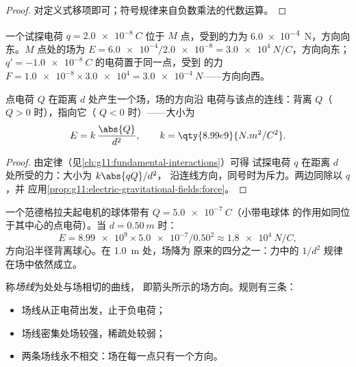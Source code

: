 \begin{proof}
对定义式移项即可；符号规律来自负数乘法的代数运算。
\end{proof}

\begin{example}[读取场]\label{ex:g11:electric-gravitational-fields:reading}
一个试探电荷 $q = \qty{+2.0e-8}{C}$ 位于 $M$ 点，受到的力为
\qty{6.0e-4}{N}，方向向东。$M$ 点处的场为
$E = \num{6.0e-4} / \num{2.0e-8} = \qty{3.0e4}{N/C}$，方向向东；
$q' = \qty{-1.0e-8}{C}$ 的电荷置于同一点，受到
的力 $F = \num{1.0e-8} \times \num{3.0e4} = \qty{3.0e-4}{N}$——方向向西。
\end{example}

\begin{proposition}[点电荷的场]\label{prop:g11:electric-gravitational-fields:point}
点电荷 $Q$ 在距离 $d$ 处产生一个场，场的方向沿
电荷与该点的连线：背离 $Q$（$Q > 0$ 时），指向它（
$Q < 0$ 时）——大小为
\[
E = k\,\frac{\abs{Q}}{d^2},
\qquad k = \qty{8.99e9}{N.m^2/C^2}.
\]
\end{proposition}

\begin{proof}
由定律（见\cref{ch:g11:fundamental-interactions}）可得
试探电荷 $q$ 在距离 $d$ 处所受的力：大小为 $k \abs{qQ} / d^2$，
沿连线方向，同号时为斥力。两边同除以 $q$，并
应用\cref{prop:g11:electric-gravitational-fields:force}。
\end{proof}

\begin{example}[带电球体]\label{ex:g11:electric-gravitational-fields:sphere}
一个范德格拉夫起电机的球体带有 $Q = \qty{+5.0e-7}{C}$（小带电球体
的作用如同位于其中心的点电荷）。当 $d = \qty{0.50}{m}$ 时：
\[
E = \num{8.99e9} \times \num{5.0e-7} / 0.50^2 \approx \qty{1.8e4}{N/C},
\]
方向沿半径背离球心。在 \qty{1.0}{m} 处，场降为
原来的四分之一：力中的 $1/d^2$ 规律在场中依然成立。
\end{example}

\begin{definition}[场线]\label{def:g11:electric-gravitational-fields:lines}
称\emph{场线}为处处与场相切的曲线，
即箭头所示的场方向。规则有三条：
\begin{itemize}
  \item 场线从正电荷出发，止于负电荷；
  \item 场线密集处场较强，稀疏处较弱；
  \item 两条场线永不相交：场在每一点只有一个方向。
\end{itemize}
\end{definition}

